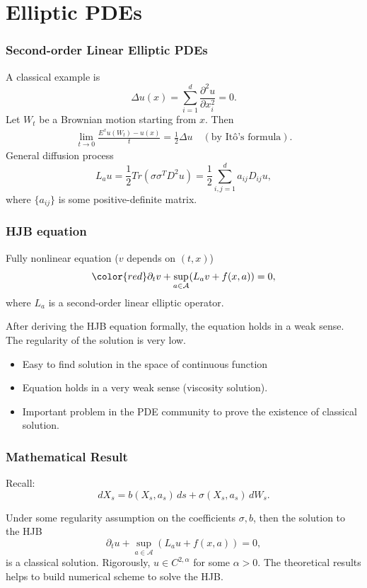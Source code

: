\documentclass{beamer}
\begin{document}
\section{Elliptic PDEs}
\begin{frame}
\frametitle{Second-order Linear Elliptic PDEs}
A classical example is 
\begin{equation*}
\Delta u(x) = \sum_{i=1}^d\frac{\partial^2 u}{\partial x_i^2}= 0.
\end{equation*}
Let $W_t$ be a Brownian motion starting from $x$. Then 
\begin{align*}
\lim_{t\to 0}\frac{E^xu(W_t)-u(x)}{t} = \frac{1}{2}\Delta u\quad  (\text{by It\^{o}'s formula}). 
\end{align*}
General diffusion process
$$L_a u = \frac{1}{2}Tr(\sigma \sigma^T D^2 u) = \frac{1}{2}\sum_{i,j=1}^da_{ij}D_{ij}u,$$ 
where $\{a_{ij}\}$ is some positive-definite matrix.

\end{frame}
\begin{frame}
\frametitle{HJB equation}
Fully nonlinear equation ({\color{red}$v$ depends on $(t,x)$})
\begin{equation*}
{\color{red}\partial_t v} + \sup_{a\in \mathcal{A}}(L_a v +f(x,a)) = 0,
\end{equation*}
where $L_a$ is a second-order linear elliptic operator. 

\vfill
After deriving the HJB equation formally,  the equation holds in a weak sense. The regularity of the solution is very low. 
\begin{itemize}
\item Easy to find solution in the space of continuous function 
\item Equation holds in a very weak sense (viscosity solution).
\item Important problem in the PDE community to prove the existence of classical solution.
\end{itemize}
\end{frame}

\begin{frame}

\frametitle{Mathematical Result}
Recall:
$$
dX_s = b(X_s,a_s)\,ds + \sigma(X_s,a_s)\,dW_s.
$$

Under some regularity assumption on the coefficients $\sigma,b$, then the solution to the HJB
$$
{\partial_t u} + \sup_{a\in \mathcal{A}}(L_a u +f(x,a)) = 0,
$$
is a classical solution. Rigorously, $u\in C^{2,\alpha}$ for some $\alpha>0$. 
\vfill
The theoretical results helps to build numerical scheme to solve the HJB.
\end{frame}
\end{document}
